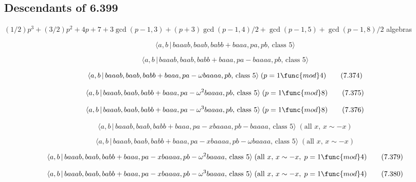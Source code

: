 \documentclass[10pt]{article}
\begin{document}
\subsection{Descendants of 6.399}

$(1/2)p^{3}+(3/2)p^{2}+4p+7+3\gcd (p-1,3)+(p+3)\gcd (p-1,4)/2+\gcd
(p-1,5)+\gcd (p-1,8)/2$ algebras

\begin{equation}
\langle a,b\,|\,baaab,baab,babb+baaa,pa,pb,\,\text{class }5\rangle 
\tag{7.372}
\end{equation}

\begin{equation}
\langle a,b\,|\,baaab,baab,babb+baaa,pa-baaaa,pb,\,\text{class }5\rangle 
\tag{7.373}
\end{equation}

\begin{equation}
\langle a,b\,|\,baaab,baab,babb+baaa,pa-\omega baaaa,pb,\,\text{class }%
5\rangle \;(p=1\func{mod}4)  \tag{7.374}
\end{equation}

\begin{equation}
\langle a,b\,|\,baaab,baab,babb+baaa,pa-\omega ^{2}baaaa,pb,\,\text{class }%
5\rangle \;(p=1\func{mod}8)  \tag{7.375}
\end{equation}

\begin{equation}
\langle a,b\,|\,baaab,baab,babb+baaa,pa-\omega ^{3}baaaa,pb,\,\text{class }%
5\rangle \;(p=1\func{mod}8)  \tag{7.376}
\end{equation}

\begin{equation}
\langle a,b\,|\,baaab,baab,babb+baaa,pa-xbaaaa,pb-baaaa,\,\text{class }%
5\rangle \;(\text{all }x,\,x\sim -x)  \tag{7.377}
\end{equation}

\begin{equation}
\langle a,b\,|\,baaab,baab,babb+baaa,pa-xbaaaa,pb-\omega baaaa,\,\text{class 
}5\rangle \;(\text{all }x,\,x\sim -x)  \tag{7.378}
\end{equation}

\begin{equation}
\langle a,b\,|\,baaab,baab,babb+baaa,pa-xbaaaa,pb-\omega ^{2}baaaa,\,\text{%
class }5\rangle \;(\text{all }x,\,x\sim -x,\;p=1\func{mod}4)  \tag{7.379}
\end{equation}

\begin{equation}
\langle a,b\,|\,baaab,baab,babb+baaa,pa-xbaaaa,pb-\omega ^{3}baaaa,\,\text{%
class }5\rangle \;(\text{all }x,\,x\sim -x,\;p=1\func{mod}4)  \tag{7.380}
\end{equation}
\end{document}
